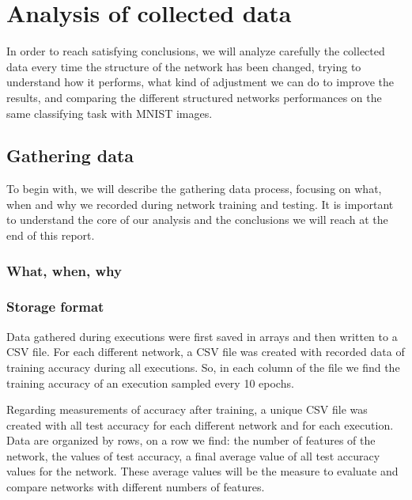 \chapter{Analysis of collected data}\label{ch:data_analysis}

In order to reach satisfying conclusions, we will analyze carefully the collected data every time the structure of the network has been changed, trying to understand how it performs, what kind of adjustment we can do to improve the results, and comparing the different structured networks performances on the same classifying task with MNIST images.

\section{Gathering data}

To begin with, we will describe the gathering data process, focusing on what, when and why we recorded during network training and testing. It is important to understand the core of our analysis and the conclusions we will reach at the end of this report.

\subsection{What, when, why}

\subsection{Storage format}

Data gathered during executions were first saved in arrays and then written to a CSV file. For each different network, a CSV file was created with recorded data of training accuracy during all executions. So, in each column of the file we find the training accuracy of an execution sampled every 10 epochs.

Regarding measurements of accuracy after training, a unique CSV file was created with all test accuracy for each different network and for each execution. Data are organized by rows, on a row we find: the number of features of the network, the values of test accuracy, a final average value of all test accuracy values for the network. These average values will be the measure to evaluate and compare networks with different numbers of features.